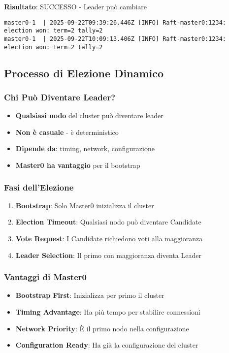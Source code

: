 \documentclass[12pt,a4paper]{article}
\begin{document}
\textbf{Risultato}: SUCCESSO - Leader può cambiare
\begin{lstlisting}
master0-1  | 2025-09-22T09:39:26.446Z [INFO] Raft-master0:1234: election won: term=2 tally=2
master0-1  | 2025-09-22T10:09:13.406Z [INFO] Raft-master0:1234: election won: term=2 tally=2
\end{lstlisting}

\subsection{Processo di Elezione Dinamico}

\subsubsection{Chi Può Diventare Leader?}

\begin{itemize}
\item \textbf{Qualsiasi nodo} del cluster può diventare leader
\item \textbf{Non è casuale} - è deterministico
\item \textbf{Dipende da}: timing, network, configurazione
\item \textbf{Master0 ha vantaggio} per il bootstrap
\end{itemize}

\subsubsection{Fasi dell'Elezione}

\begin{enumerate}
\item \textbf{Bootstrap}: Solo Master0 inizializza il cluster
\item \textbf{Election Timeout}: Qualsiasi nodo può diventare Candidate
\item \textbf{Vote Request}: I Candidate richiedono voti alla maggioranza
\item \textbf{Leader Selection}: Il primo con maggioranza diventa Leader
\end{enumerate}

\subsubsection{Vantaggi di Master0}

\begin{itemize}
\item \textbf{Bootstrap First}: Inizializza per primo il cluster
\item \textbf{Timing Advantage}: Ha più tempo per stabilire connessioni
\item \textbf{Network Priority}: È il primo nodo nella configurazione
\item \textbf{Configuration Ready}: Ha già la configurazione del cluster
\end{itemize}
\end{document}
